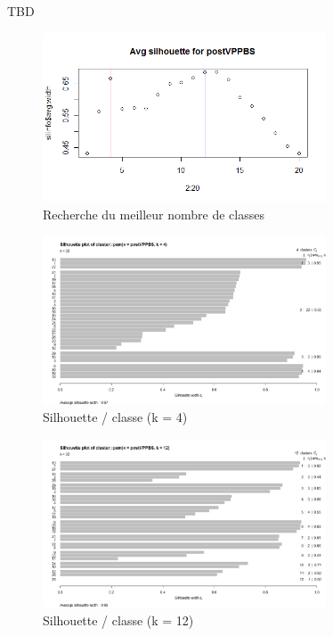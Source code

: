 %
%


TBD

\begin{figure}[H]
\centering
\includegraphics[width=0.75\textwidth]{../Fig/VPPBS/vppbs-elbow-post.png}
\caption{Recherche du meilleur nombre de classes}
\end{figure}

\begin{figure}[H]
\centering
\includegraphics[width=0.75\textwidth]{../Fig/VPPBS/vppbs-sil-k4-post.png}
\caption{Silhouette / classe (k = 4)}
\end{figure}

\begin{figure}[H]
\centering
\includegraphics[width=0.75\textwidth]{../Fig/VPPBS/vppbs-sil-k12-post.png}
\caption{Silhouette / classe (k = 12)}
\end{figure}

